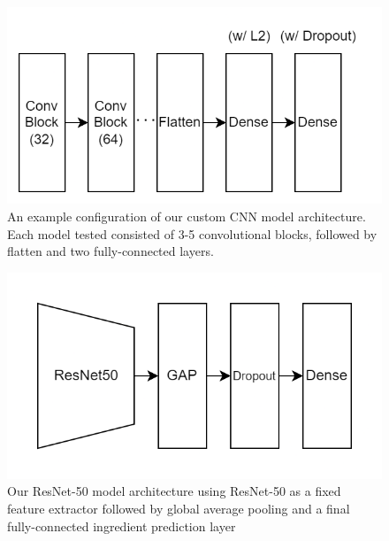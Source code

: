\documentclass[10pt,twocolumn,letterpaper]{article}
\begin{document}
\begin{figure}[ht]
\begin{center}
   \includegraphics[width=1\linewidth]{custom-model.drawio.png}
\end{center}
\caption{An example configuration of our custom CNN model architecture. Each model tested consisted of 3-5 convolutional blocks, followed by flatten and two fully-connected layers.}
\label{fig:onecol}
\end{figure}

\begin{figure}[ht]
\begin{center}
   \includegraphics[width=1\linewidth]{resnet-model.drawio.png}
\end{center}
\caption{Our ResNet-50 model architecture using ResNet-50 as a fixed feature extractor followed by global average pooling and a final fully-connected ingredient prediction layer}
\label{fig:onecol}
\end{figure}


\end{document}
